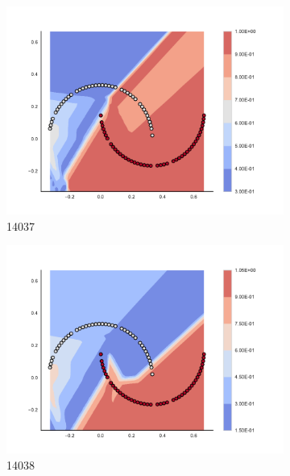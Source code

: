 \begin{figure}[h]
\begin{subfigure}[b]{0.09\textwidth}
    \includegraphics[clip, trim=2.35cm 1.75cm 4.5cm 0cm,width=\textwidth]{img/convergence/14037.pdf}
    \caption{14037}
    \label{fig:convergence_14037}
\end{subfigure}
%
\begin{subfigure}[b]{0.09\textwidth}
    \includegraphics[clip, trim=2.35cm 1.75cm 4.5cm 0cm,width=\textwidth]{img/convergence/14038.pdf}
    \caption{14038}
    \label{fig:convergence_14038}
\end{subfigure}
%
\begin{subfigure}[b]{0.09\textwidth}

\end{subfigure}
\end{figure}
